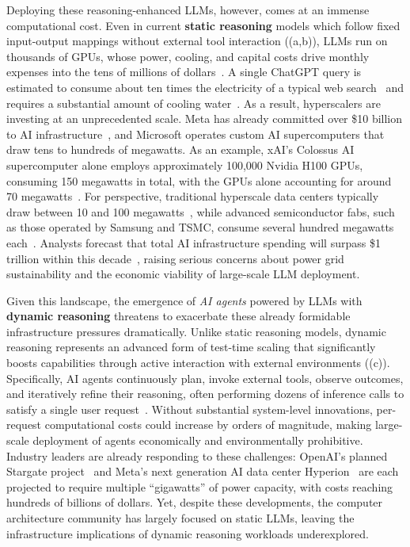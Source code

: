Deploying these reasoning-enhanced LLMs, however, comes at an immense computational cost. Even in current \textbf{static reasoning} models which follow fixed input-output mappings without external tool interaction ((a,b)), LLMs run on thousands of GPUs, whose power, cooling, and capital costs drive monthly expenses into the tens of millions of dollars~\cite{openai_cost_2023}. A single ChatGPT query is estimated to consume about ten times the electricity of a typical web search~\cite{AI_energy_footprint} and requires a substantial amount of cooling water~\cite{AI_water_footprint}. As a result, hyperscalers are investing at an unprecedented scale. Meta has already committed over \$10 billion to AI infrastructure~\cite{meta_10_billion}, and Microsoft operates custom AI supercomputers that draw tens to hundreds of megawatts. As an example, xAI’s Colossus AI supercomputer alone employs approximately 100,000 Nvidia H100 GPUs, consuming 150 megawatts in total, with the GPUs alone accounting for around 70 megawatts~\cite{xAI_collosus}. For perspective, traditional hyperscale data centers typically draw between 10 and 100 megawatts~\cite{hyperscale_datacenter}, while advanced semiconductor fabs, such as those operated by Samsung and TSMC, consume several hundred megawatts each~\cite{tsmc_fab_power,fab_power}. Analysts forecast that total AI infrastructure spending will surpass \$1 trillion within this decade~\cite{capex_forecast}, raising serious concerns about power grid sustainability and the economic viability of large-scale LLM deployment.


Given this landscape, the emergence of \emph{AI agents} powered by LLMs with \textbf{dynamic reasoning} threatens to exacerbate these already formidable infrastructure pressures dramatically. Unlike static reasoning models, dynamic reasoning represents an advanced form of test-time scaling that significantly boosts capabilities through active interaction with external environments ((c)). Specifically, AI agents continuously plan, invoke external tools, observe outcomes, and iteratively refine their reasoning, often performing dozens of inference calls to satisfy a single user request~\cite{react,reflexion,lats}. Without substantial system-level innovations, per-request computational costs could increase by orders of magnitude, making large-scale deployment of agents economically and environmentally prohibitive. Industry leaders are already responding to these challenges: OpenAI’s planned Stargate project~\cite{openai_stargate} and Meta's next generation AI data center Hyperion~\cite{meta_hyperion_prometheus} are each projected to require multiple ``gigawatts'' of power capacity, with costs reaching hundreds of billions of dollars. Yet, despite these developments, the computer architecture community has largely focused on static LLMs, leaving the infrastructure implications of dynamic reasoning workloads underexplored.


